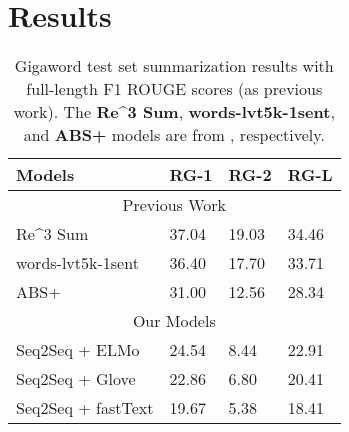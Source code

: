 \section{Results}
\label{sec: result}

\begin{table}[ht]
\centering
\caption{Gigaword test set summarization results with full-length F1 ROUGE scores (as previous work). The \textbf{Re\^{}3 Sum}, \textbf{words-lvt5k-1sent}, and \textbf{ABS+} models are from \cite{cao2018retrieve, nallapati2016abstractive, rush2015neural}, respectively.}
\begin{tabular}{|l|l|l|l|} 
\hline
Models                                        & \multicolumn{1}{c|}{RG-1} & \multicolumn{1}{c|}{RG-2} & \multicolumn{1}{c|}{RG-L}  \\ 
\hline
\multicolumn{4}{|c|}{Previous Work}                                                                                                         \\ 
\hline
Re\^{}3 Sum         & 37.04                        & 19.03                        & 34.46                         \\ 
\hline
words-lvt5k-1sent & 36.40                        & 17.70                        & 33.71                         \\ 
\hline
ABS+               & 31.00                        & 12.56                        & 28.34                         \\ 
\hline
\multicolumn{4}{|c|}{Our Models}                                                                                                            \\ 
\hline
Seq2Seq + ELMo                                & 24.54                             & 8.44                             & 22.91                               \\ 
\hline
Seq2Seq + Glove                               & 22.86                            & 6.80                             & 20.41                               \\ 
\hline
Seq2Seq + fastText                            & 19.67                             & 5.38                             & 18.41                               \\
\hline
\end{tabular}
\label{tab: compare_embed}
\end{table}



